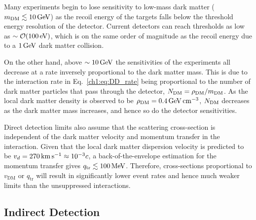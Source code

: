 Many experiments begin to lose sensitivity to low-mass dark matter ($m_\mathrm{DM}\lesssim 10{\rm \,GeV}$) as the recoil energy of the targets falls below the threshold energy resolution of the detector. Current detectors can reach thresholds as low as $\sim {\cal O} (100{\rm \,eV})$, which is on the same order of magnitude as the recoil energy due to a $1{\rm \,GeV}$ dark matter collision. 

On the other hand, above $\sim 10{\rm \,GeV}$ the sensitivities of the experiments all decrease at a rate inversely proportional to the dark matter mass.  This is due to the interaction rate in Eq.~\ref{ch1:eq:DD_rate} being proportional to the number of dark matter particles that pass through the detector, $N_\mathrm{DM} = \rho_\mathrm{DM}/m_\mathrm{DM}$. As the local dark matter density is observed to be $\rho_\mathrm{DM} = 0.4{\rm \,GeV} {\rm \,cm}^{-3}$, $N_\mathrm{DM}$ decreases as the dark matter mass increases, and hence so do the detector sensitivities. 

Direct detection limits also assume that the scattering cross-section is independent of the dark matter velocity and momentum transfer in the interaction. Given that the local dark matter dispersion velocity is predicted to be $v_d = 270{\rm \,km}{\rm \,s}^{-1} \approx 10^{-3}c$, a back-of-the-envelope estimation for the momentum transfer gives $q_\mathrm{tr}\lesssim 100 {\rm \,MeV}$. Therefore, cross-sections proportional to $v_\mathrm{DM}$ or $q_\mathrm{tr}$ will result in significantly lower event rates and hence much weaker limits than the unsuppressed interactions. 

\subsection{Indirect Detection}

